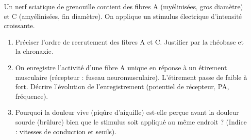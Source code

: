 \documentclass[11pt]{article}
\begin{document}
\begin{exercice}
Un nerf sciatique de grenouille contient des fibres A (myélinisées, gros diamètre) et C (amyélinisées, fin diamètre). On applique un stimulus électrique d'intensité croissante.
\begin{enumerate}
    \item Préciser l'ordre de recrutement des fibres A et C. Justifier par la rhéobase et la chronaxie.
    \item On enregistre l'activité d'une fibre A unique en réponse à un étirement musculaire (récepteur : fuseau neuromusculaire). L'étirement passe de faible à fort. Décrire l'évolution de l'enregistrement (potentiel de récepteur, PA, fréquence).
    \item Pourquoi la douleur vive (piqûre d'aiguille) est-elle perçue avant la douleur sourde (brûlure) bien que le stimulus soit appliqué au même endroit ? (Indice : vitesses de conduction et seuils).
\end{enumerate}
\end{exercice}
\end{document}
